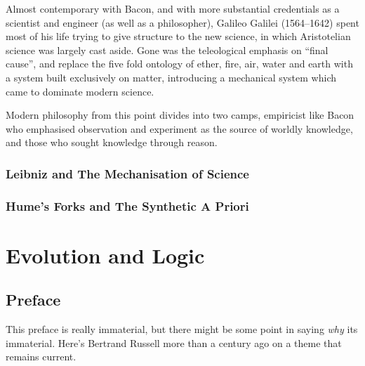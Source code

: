 \documentclass[10pt,titlepage]{book}
\begin{document}
Almost contemporary with Bacon, and with more substantial credentials as a scientist and engineer (as well as a philosopher), Galileo Galilei (1564–1642) spent most of his life trying to give structure to the new science, in which Aristotelian science was largely cast aside.
Gone was the teleological emphasis on ``final cause'', and replace the five fold ontology of ether, fire, air, water and earth with a system built exclusively on matter, introducing a mechanical system which came to dominate modern science.

Modern philosophy from this point divides into two camps, empiricist like Bacon who emphasised observation and experiment as the source of worldly knowledge, and those who sought knowledge through reason.

\subsection{Leibniz and The Mechanisation of Science}

\subsection{Hume's Forks and The Synthetic A Priori}

\chapter{Evolution and Logic}


\section*{Preface}


This preface is really immaterial, but there might be some point in saying \emph{why} its immaterial.
Here's Bertrand Russell more than a century ago on a theme that remains current.
\end{document}
